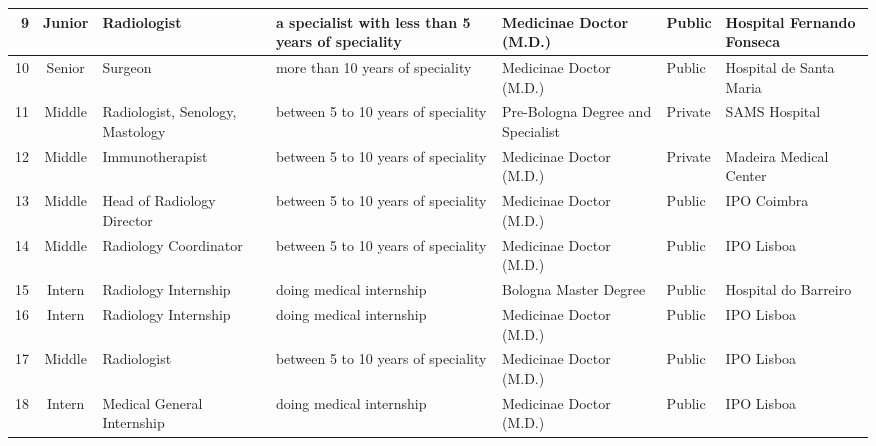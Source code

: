 \begin{landscape}
\begin{table}[htbp]
{\begin{tabular}{|r|c|l|l|l|l|l|}
9           & Junior         & Radiologist                      & a specialist with less than 5 years of speciality     & Medicinae Doctor (M.D.)                       & Public               & Hospital Fernando Fonseca \\ \hline
10          & Senior         & Surgeon                          & more than 10 years of speciality                      & Medicinae Doctor (M.D.)                       & Public               & Hospital de Santa Maria   \\ \hline
11          & Middle         & Radiologist, Senology, Mastology & between 5 to 10 years of speciality                   & Pre-Bologna Degree and Specialist             & Private              & SAMS Hospital             \\ \hline
12          & Middle         & Immunotherapist                  & between 5 to 10 years of speciality                   & Medicinae Doctor (M.D.)                       & Private              & Madeira Medical Center    \\ \hline
13          & Middle         & Head of Radiology Director       & between 5 to 10 years of speciality                   & Medicinae Doctor (M.D.)                       & Public               & IPO Coimbra               \\ \hline
14          & Middle         & Radiology Coordinator            & between 5 to 10 years of speciality                   & Medicinae Doctor (M.D.)                       & Public               & IPO Lisboa                \\ \hline
15          & Intern         & Radiology Internship             & doing medical internship                              & Bologna Master Degree                         & Public               & Hospital do Barreiro      \\ \hline
16          & Intern         & Radiology Internship             & doing medical internship                              & Medicinae Doctor (M.D.)                       & Public               & IPO Lisboa                \\ \hline
17          & Middle         & Radiologist                      & between 5 to 10 years of speciality                   & Medicinae Doctor (M.D.)                       & Public               & IPO Lisboa                \\ \hline
18          & Intern         & Medical General Internship       & doing medical internship                              & Medicinae Doctor (M.D.)                       & Public               & IPO Lisboa                \\ \hline

\end{tabular}}
\end{table}
\end{landscape}
